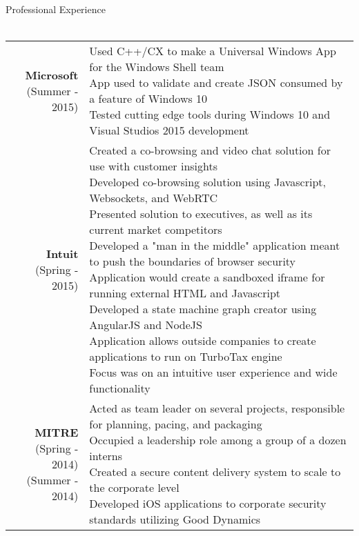 \documentclass{article}
\makeatletter
\newcommand{\lineseparator}[1]{\noindent\makebox[\linewidth]{\rule{\textwidth}{#1}}}
\newcommand*\lineBr[2][c]{\begin{tabular}[#1]{@{}r@{}}#2\end{tabular}}
\newcommand*\lineBl[2][c]{\begin{tabular}[#1]{@{}l@{}}#2\end{tabular}}
\makeatother
\begin{document}
{\Large Professional Experience } \\
\lineseparator{0.5pt}
\\[2mm]
\begin{tabularx}{\textwidth}{ r | X }
  \vspace{2mm}
  \lineBr{ {\large {\bf Microsoft }\\ (Summer - 2015)} } &
  \lineBl{
    Used C++/CX to make a Universal Windows App for the Windows Shell team \\ 
    App used to validate and create JSON consumed by a feature of Windows 10 \\
    Tested cutting edge tools during Windows 10 and Visual Studios 2015 development 
  } \\
  \vspace{2mm}
  \lineBr{ {\large {\bf Intuit }\\ (Spring - 2015)} } &
  \lineBl{
    Created a co-browsing and video chat solution for use with customer insights \\
    Developed co-browsing solution using Javascript, Websockets, and WebRTC \\
    Presented solution to executives, as well as its current market competitors \\
    Developed a "man in the middle" application meant to push the boundaries of browser security \\
    Application would create a sandboxed iframe for running external HTML and Javascript \\
    Developed a state machine graph creator using AngularJS and NodeJS \\
    Application allows outside companies to create applications to run on TurboTax engine \\
    Focus was on an intuitive user experience and wide functionality \\
  } \\
  \vspace{2mm}
  \lineBr{ {\large {\bf MITRE }\\ (Spring - 2014) \\ (Summer - 2014)} } &
  \lineBl{
    Acted as team leader on several projects, responsible for planning, pacing, and packaging \\
    Occupied a leadership role among a group of a dozen interns \\
    Created a secure content delivery system to scale to the corporate level \\
    Developed iOS applications to corporate security standards utilizing Good Dynamics \\
}
\end{tabularx}
\end{document}
